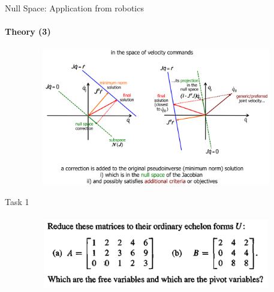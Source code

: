 \documentclass[aspectratio=169]{beamer}
\begin{document}
\begin{frame}[t]{Null Space: Application from robotics}
    \framesubtitle{Theory (3)}
    \vspace{-0.6cm}
    \begin{figure}[H]
        \centering\includegraphics[height=6cm,width=1\textwidth,keepaspectratio]{rob_app_geometry.png}
        \label{fig:rob_app_geometry.png}
    \end{figure}
\end{frame}



\begin{frame}[t]{Task 1}
    \framesubtitle{}
    \begin{figure}[H]
        \centering\includegraphics[height=3cm,width=1\textwidth,keepaspectratio]{1.png}
        \label{fig:1.png}
    \end{figure}
\end{frame}
\end{document}
